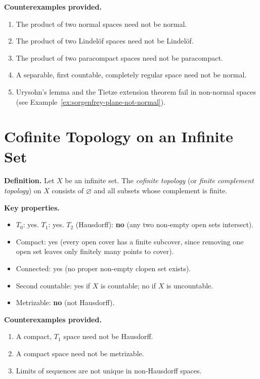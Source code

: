 \documentclass[11pt,a4paper,twoside]{book}
\theoremstyle{remark}
\theoremstyle{definition}
\theoremstyle{definition}
\begin{document}
\textbf{Counterexamples provided.}
\begin{enumerate}
  \item The product of two normal spaces need not be normal.
  \item The product of two Lindel\"of spaces need not be Lindel\"of.
  \item The product of two paracompact spaces need not be paracompact.
  \item A separable, first countable, completely regular space need not
        be normal.
  \item Urysohn's lemma and the Tietze extension theorem fail in
        non-normal spaces (see Example~\ref{ex:sorgenfrey-plane-not-normal}).
\end{enumerate}

\section{Cofinite Topology on an Infinite Set}
\label{app:cofinite}

\textbf{Definition.}
Let $X$ be an infinite set.  The \emph{cofinite topology} (or
\emph{finite complement topology}) on $X$ consists of $\varnothing$
and all subsets whose complement is finite.

\medskip
\textbf{Key properties.}
\begin{itemize}
  \item $T_0$: yes. \quad $T_1$: yes. \quad $T_2$ (Hausdorff): \textbf{no}
        (any two non-empty open sets intersect).
  \item Compact: yes (every open cover has a finite subcover, since
        removing one open set leaves only finitely many points to cover).
  \item Connected: yes (no proper non-empty clopen set exists).
  \item Second countable: yes if $X$ is countable; no if $X$ is
        uncountable.
  \item Metrizable: \textbf{no} (not Hausdorff).
\end{itemize}

\textbf{Counterexamples provided.}
\begin{enumerate}
  \item A compact, $T_1$ space need not be Hausdorff.
  \item A compact space need not be metrizable.
  \item Limits of sequences are not unique in non-Hausdorff spaces.
\end{enumerate}
\end{document}
